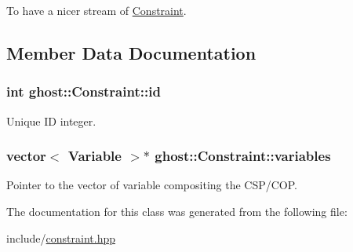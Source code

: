 To have a nicer stream of \hyperlink{classghost_1_1Constraint}{Constraint}. 



\subsection{Member Data Documentation}
\subsubsection[{\texorpdfstring{id}{id}}]{\setlength{\rightskip}{0pt plus 5cm}int ghost\+::\+Constraint\+::id\hspace{0.3cm}{\ttfamily [protected]}}\hypertarget{classghost_1_1Constraint_a5215df3cd5269adb4c5f6168191b9d47}{}\label{classghost_1_1Constraint_a5215df3cd5269adb4c5f6168191b9d47}


Unique ID integer. 

\subsubsection[{\texorpdfstring{variables}{variables}}]{\setlength{\rightskip}{0pt plus 5cm}vector$<$ {\bf Variable} $>$$\ast$ ghost\+::\+Constraint\+::variables\hspace{0.3cm}{\ttfamily [protected]}}\hypertarget{classghost_1_1Constraint_a1730b1b54d03d221e6e2a95185a2184b}{}\label{classghost_1_1Constraint_a1730b1b54d03d221e6e2a95185a2184b}


Pointer to the vector of variable compositing the C\+S\+P/\+C\+OP. 



The documentation for this class was generated from the following file\+:\begin{DoxyCompactItemize}
\item 
include/\hyperlink{constraint_8hpp}{constraint.\+hpp}\end{DoxyCompactItemize}
